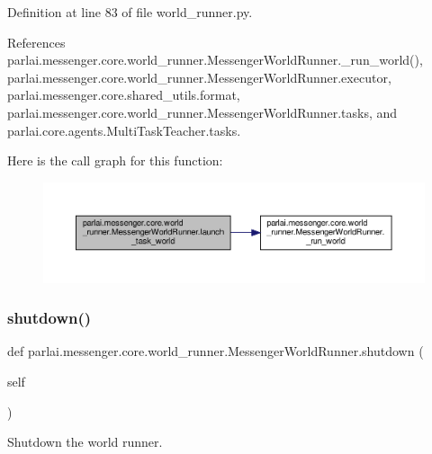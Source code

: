 Definition at line 83 of file world\+\_\+runner.\+py.



References parlai.\+messenger.\+core.\+world\+\_\+runner.\+Messenger\+World\+Runner.\+\_\+run\+\_\+world(), parlai.\+messenger.\+core.\+world\+\_\+runner.\+Messenger\+World\+Runner.\+executor, parlai.\+messenger.\+core.\+shared\+\_\+utils.\+format, parlai.\+messenger.\+core.\+world\+\_\+runner.\+Messenger\+World\+Runner.\+tasks, and parlai.\+core.\+agents.\+Multi\+Task\+Teacher.\+tasks.

Here is the call graph for this function\+:
\nopagebreak
\begin{figure}[H]
\begin{center}
\leavevmode
\includegraphics[width=350pt]{classparlai_1_1messenger_1_1core_1_1world__runner_1_1MessengerWorldRunner_a4fc3aded0f50104a425b65def4738607_cgraph}
\end{center}
\end{figure}
\mbox{\label{classparlai_1_1messenger_1_1core_1_1world__runner_1_1MessengerWorldRunner_af16885a47e8d5cab2b6bdcc8af55c241}} 
\subsubsection{\texorpdfstring{shutdown()}{shutdown()}}
{\footnotesize\ttfamily def parlai.\+messenger.\+core.\+world\+\_\+runner.\+Messenger\+World\+Runner.\+shutdown (\begin{DoxyParamCaption}\item[{}]{self }\end{DoxyParamCaption})}

\begin{DoxyVerb}Shutdown the world runner.\end{DoxyVerb}
 

